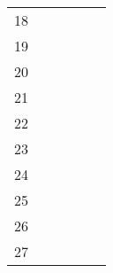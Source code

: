 \begin{table}[ht]
\begin{tabular}{c|lllll}
    18                       &                                          &                                           &                                                &                                    &                                      \\
    19                       &                                          &                                           &                                                &                                    &                                      \\
    20                       &                                          &                                           &                                                &                                    &                                      \\
    21                       &                                          &                                           &                                                &                                    &                                      \\
    22                       &                                          &                                           &                                                &                                    &                                      \\
    23                       &                                          &                                           &                                                &                                    &                                      \\
    24                       &                                          &                                           &                                                &                                    &                                      \\
    25                       &                                          &                                           &                                                &                                    &                                      \\
    26                       &                                          &                                           &                                                &                                    &                                      \\
    27                       &                                          &                                           &                                                &                                    &                                      \\

\end{tabular}
\end{table}
